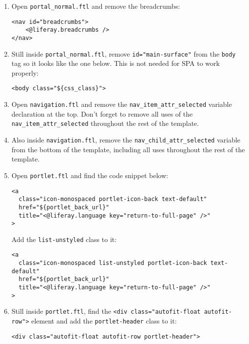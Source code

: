 \begin{enumerate}
\def\labelenumi{\arabic{enumi}.}
\item
  Open \texttt{portal\_normal.ftl} and remove the breadcrumbs:

\begin{verbatim}
<nav id="breadcrumbs">      
    <@liferay.breadcrumbs />        
</nav>
\end{verbatim}
\item
  Still inside \texttt{portal\_normal.ftl}, remove
  \texttt{id="main-surface"} from the \texttt{body} tag so it looks like
  the one below. This is not needed for SPA to work properly:

\begin{verbatim}
<body class="${css_class}">
\end{verbatim}
\item
  Open \texttt{navigation.ftl} and remove the
  \texttt{nav\_item\_attr\_selected} variable declaration at the top.
  Don't forget to remove all uses of the
  \texttt{nav\_item\_attr\_selected} throughout the rest of the
  template.
\item
  Also inside \texttt{navigation.ftl}, remove the
  \texttt{nav\_child\_attr\_selected} variable from the bottom of the
  template, including all uses throughout the rest of the template.
\item
  Open \texttt{portlet.ftl} and find the code snippet below:

\begin{verbatim}
<a 
  class="icon-monospaced portlet-icon-back text-default" 
  href="${portlet_back_url}" 
  title="<@liferay.language key="return-to-full-page" />"
>
\end{verbatim}

  Add the \texttt{list-unstyled} class to it:

\begin{verbatim}
<a 
  class="icon-monospaced list-unstyled portlet-icon-back text-default" 
  href="${portlet_back_url}" 
  title="<@liferay.language key="return-to-full-page" />"
>
\end{verbatim}
\item
  Still inside \texttt{portlet.ftl}, find the
  \texttt{\textless{}div\ class="autofit-float\ autofit-row"\textgreater{}}
  element and add the \texttt{portlet-header} class to it:

\begin{verbatim}
<div class="autofit-float autofit-row portlet-header">
\end{verbatim}
\end{enumerate}

